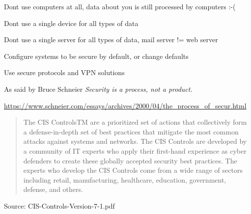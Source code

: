 \documentclass[Screen16to9,17pt]{foils}
\begin{document}

\begin{list1}
\item Dont use computers at all, data about you is still processed by computers :-(
\item Dont use a single device for all types of data
\item Dont use a single server for all types of data, mail server != web server
\item Configure systems to be secure by default, or change defaults
\item Use secure protocols and VPN solutions
\end{list1}

As said by Bruce Schneier \emph{Security is a process, not a product.}

{\footnotesize\url{https://www.schneier.com/essays/archives/2000/04/the_process_of_secur.html}}


\begin{quote}
  The CIS ControlsTM are a prioritized set of actions that collectively form a defense-in-depth set
of best practices that mitigate the most common attacks against systems and networks. The
CIS Controls are developed by a community of IT experts who apply their first-hand experience
as cyber defenders to create these globally accepted security best practices. The experts who
develop the CIS Controls come from a wide range of sectors including retail, manufacturing,
healthcare, education, government, defense, and others.
\end{quote}

Source:  CIS-Controls-Version-7-1.pdf

\end{document}
